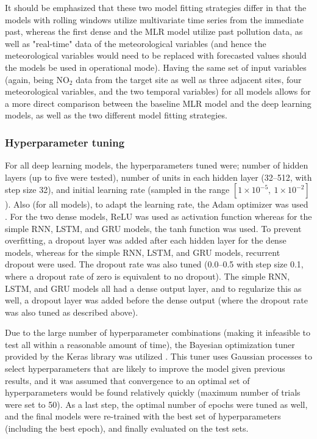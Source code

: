 It should be emphasized that these two model fitting strategies differ in that the models with rolling windows utilize multivariate time series from the immediate past, whereas the first dense and the MLR model utilize past pollution data, as well as "real-time" data of the meteorological variables (and hence the meteorological variables would need to be replaced with forecasted values should the models be used in operational mode). Having the same set of input variables (again, being NO$_2$ data from the target site as well as three adjacent sites, four meteorological variables, and the two temporal variables) for all models allows for a more direct comparison between the baseline MLR model and the deep learning models, as well as the two different model fitting strategies. 

\subsubsection{Hyperparameter tuning}
\label{sec:tuning_deep_learning}
For all deep learning models, the hyperparameters tuned were; number of hidden layers (up to five were tested), number of units in each hidden layer (32--512, with step size 32), and initial learning rate (sampled in the range $[1\times10^{-5},\: 1\times10^{-2}]$). Also (for all models), to adapt the learning rate, the Adam optimizer was used \cite{chollet2015keras}. For the two dense models, ReLU was used as activation function whereas for the simple RNN, LSTM, and GRU models, the tanh function was used. To prevent overfitting, a dropout layer was added after each hidden layer for the dense models, whereas for the simple RNN, LSTM, and GRU models, recurrent dropout were used. The dropout rate was also tuned (0.0--0.5 with step size 0.1, where a dropout rate of zero is equivalent to no dropout). The simple RNN, LSTM, and GRU models all had a dense output layer, and to regularize this as well, a dropout layer was added before the dense output (where the dropout rate was also tuned as described above). 

Due to the large number of hyperparameter combinations (making it infeasible to test all within a reasonable amount of time), the Bayesian optimization tuner provided by the Keras library was utilized \cite{omalley2019kerastuner}. This tuner uses Gaussian processes to select hyperparameters that are likely to improve the model given previous results, and it was assumed that convergence to an optimal set of hyperparameters would be found relatively quickly (maximum number of trials were set to 50). 
As a last step, the optimal number of epochs were tuned as well, and the final models were re-trained with the best set of hyperparameters (including the best epoch), and finally evaluated on the test sets. 


